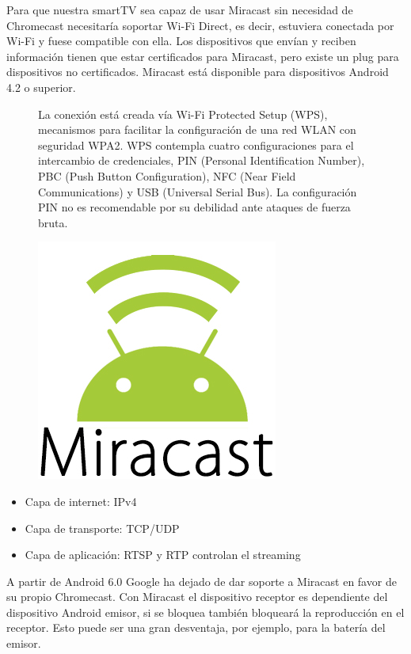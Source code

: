 Para que nuestra smartTV sea capaz de usar Miracast sin necesidad de Chromecast necesitaría soportar Wi-Fi Direct, es decir, estuviera conectada por Wi-Fi y fuese compatible con ella.
Los dispositivos que envían y reciben información tienen que estar certificados para Miracast, pero existe un plug para dispositivos no certificados.
Miracast está disponible para dispositivos Android 4.2 o superior.

\vspace{0.1cm}
\begin{figure}[ht] 
	\begin{minipage}[b]{0.55\linewidth}
		La conexión está creada vía Wi-Fi Protected Setup (WPS), mecanismos para facilitar la configuración de una red WLAN con seguridad WPA2.
		WPS contempla cuatro configuraciones para el intercambio de credenciales, PIN (Personal Identification Number), PBC (Push Button Configuration), NFC (Near Field Communications) y USB (Universal Serial Bus). La configuración PIN no es recomendable por su debilidad ante ataques de fuerza bruta.
	\end{minipage}%
	\begin{minipage}[b]{0.45\linewidth}
		\centering
		\includegraphics[width=.55\linewidth]{./Imagenes/miracast.jpg} 
	\end{minipage} 
\end{figure}

\begin{itemize}
	\item Capa de internet: IPv4
	\item Capa de transporte: TCP/UDP
	\item Capa de aplicación: RTSP y RTP controlan el streaming
\end{itemize}

A partir de Android 6.0 Google ha dejado de dar soporte a Miracast en favor de su propio Chromecast.
Con Miracast el dispositivo receptor es dependiente del dispositivo Android emisor\cite{Miracast}, si se bloquea también bloqueará la reproducción en el receptor. Esto puede ser una gran desventaja, por ejemplo, para la batería del emisor.

